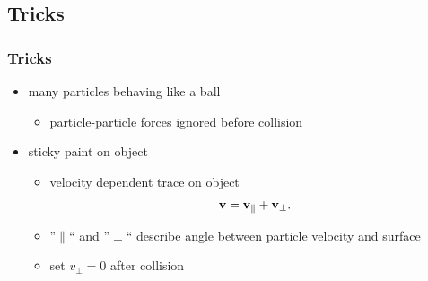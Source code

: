 \subsection{Tricks}
\begin{frame}
	\frametitle{Tricks}
	\begin{itemize}
		\item many particles behaving like a ball
			\begin{itemize}
				\item particle-particle forces ignored before collision
			\end{itemize}
		\item sticky paint on object
			\begin{itemize}
				\item velocity dependent trace on object
					\begin{gather*}
						\boldsymbol{\mathrm{v}}=\boldsymbol{\mathrm{v}}_{\parallel}+\boldsymbol{\mathrm{v}}_{\perp}.
					\end{gather*}
				\item ''$\parallel$`` and ''$\perp$`` describe angle between particle velocity and surface
				\item set $v_{\perp}=0$ after collision
			\end{itemize}
	\end{itemize}
\end{frame}

